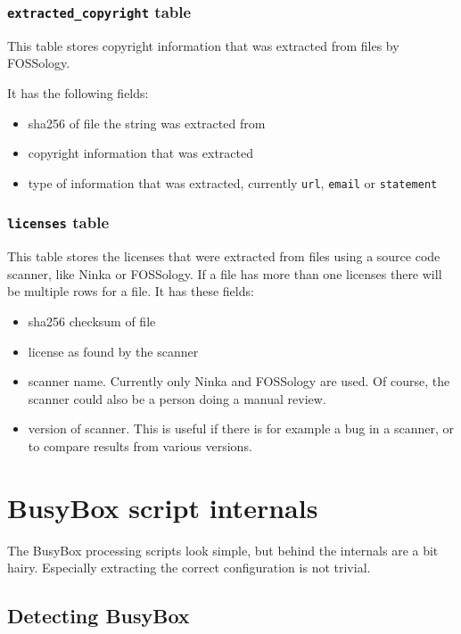 \documentclass[10pt]{article}
\begin{document}
\subsubsection{\texttt{extracted\_copyright} table}
This table stores copyright information that was extracted from files by
FOSSology.

It has the following fields:

\begin{itemize}
\item sha256 of file the string was extracted from
\item copyright information that was extracted
\item type of information that was extracted, currently \texttt{url},
\texttt{email} or \texttt{statement}
\end{itemize}

\subsubsection{\texttt{licenses} table}

This table stores the licenses that were extracted from files using a source
code scanner, like Ninka or FOSSology. If a file has more than one licenses
there will be multiple rows for a file. It has these fields:

\begin{itemize}
\item sha256 checksum of file
\item license as found by the scanner
\item scanner name. Currently only Ninka and FOSSology are used. Of course, the
scanner could also be a person doing a manual review.
\item version of scanner. This is useful if there is for example a bug in a
scanner, or to compare results from various versions.
\end{itemize}

\section{BusyBox script internals}

The BusyBox processing scripts look simple, but behind the internals are a bit
hairy. Especially extracting the correct configuration is not trivial.

\subsection{Detecting BusyBox}
\end{document}

